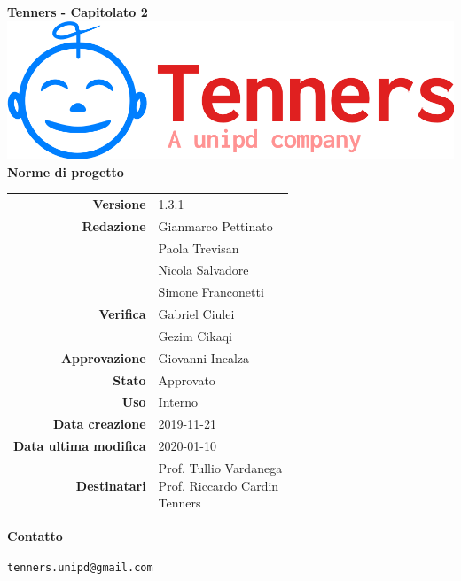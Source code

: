 \begin{titlepage}
	\begin{center}
		\large \textbf{Tenners - Capitolato 2}
		\vfill
		\includegraphics[scale = 0.3]{./res/img/logo.png}\\
		\vfill
		\Huge \textbf{Norme di progetto}

        \vfill
        \large

        \begin{tabular}{r|l}
                        \textbf{Versione} & 1.3.1 \\
                        \textbf{Redazione} &
                        Gianmarco Pettinato\\&
                        Paola Trevisan \\&
                        Nicola Salvadore \\&
												Simone Franconetti\\
                        \textbf{Verifica} &
                        Gabriel Ciulei \\&
                        Gezim Cikaqi \\
                        \textbf{Approvazione} & Giovanni Incalza\\
                        \textbf{Stato} & Approvato \\
                        \textbf{Uso} &  Interno\\
                        \textbf{Data creazione} &  2019-11-21\\
                        \textbf{Data ultima modifica} & 2020-01-10\\
                        \textbf{Destinatari} & \parbox[t]{5cm}{Prof. Tullio Vardanega\\Prof. Riccardo Cardin\\Tenners}
                \end{tabular}
                \vfill
                \normalsize
                \vfill
                \textbf{Contatto}

                \texttt{tenners.unipd@gmail.com}

	\end{center}
\end{titlepage}
